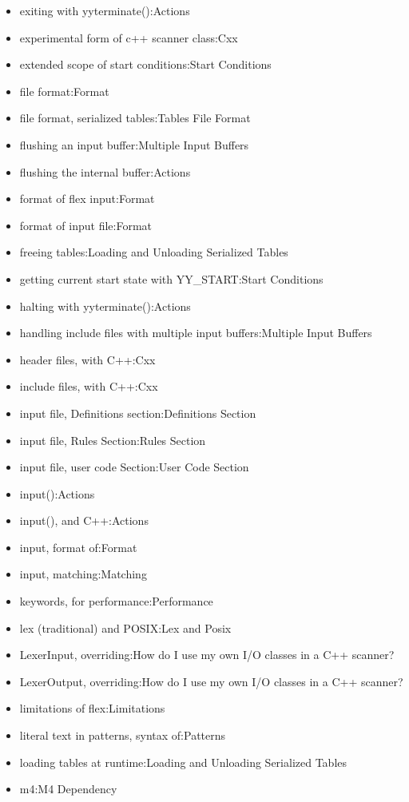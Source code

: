 \documentclass[openany,oneside]{book}
\begin{document}
\begin{itemize}
\item exiting with yyterminate():Actions
\item experimental form of c++ scanner class:Cxx
\item extended scope of start conditions:Start Conditions
\item file format:Format
\item file format, serialized tables:Tables File Format
\item flushing an input buffer:Multiple Input Buffers
\item flushing the internal buffer:Actions
\item format of flex input:Format
\item format of input file:Format
\item freeing tables:Loading and Unloading Serialized Tables
\item getting current start state with YY\_{}START:Start Conditions
\item halting with yyterminate():Actions
\item handling include files with multiple input buffers:Multiple Input Buffers
\item header files, with C++:Cxx
\item include files, with C++:Cxx
\item input file, Definitions section:Definitions Section
\item input file, Rules Section:Rules Section
\item input file, user code Section:User Code Section
\item input():Actions
\item input(), and C++:Actions
\item input, format of:Format
\item input, matching:Matching
\item keywords, for performance:Performance
\item lex (traditional) and POSIX:Lex and Posix
\item LexerInput, overriding:How do I use my own I/O classes in a C++ scanner?
\item LexerOutput, overriding:How do I use my own I/O classes in a C++ scanner?
\item limitations of flex:Limitations
\item literal text in patterns, syntax of:Patterns
\item loading tables at runtime:Loading and Unloading Serialized Tables
\item m4:M4 Dependency

\end{itemize}
\end{document}
